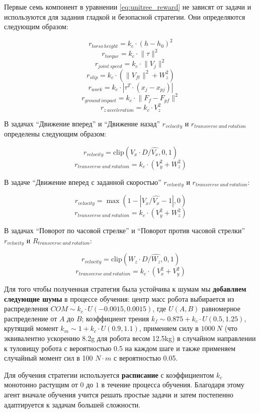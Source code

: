 Первые семь компонент в уравнении \ref{eq:unitree_reward} не зависят от задачи и используются для задания гладкой и безопасной стратегии. Они определяются следующим образом:

$$
r_{torso\ height}= k_c \cdot (h-h_0)^2
$$
$$
r_{torque} = k_c \cdot \lVert \tau \rVert ^2
$$
$$
r_{joint\ speed}= k_c \cdot \lVert V_j \rVert ^2
$$
$$
r_{slip} = k_c \cdot(\lVert V_{ft} \rVert ^2+ W_z^2)
$$
$$
r_{work}= k_c \cdot |\tau^T \cdot (x_j-x_{pj})|
$$
$$
r_{ground\ impact} = k_c \cdot \lVert F_f-F_{pf} \rVert ^2
$$
$$
r_{z\ acceleration}= k_c \cdot V_z^2
$$

В задачах ``Движение вперед'' и ``Движение назад'' $r_{velocity}$ и $r_{transverse\ and\ rotation}$ определены следующим образом: 

$$
r_{velocity} = \mathrm{clip}(V_x \cdot D / \hat{V_x}, 0, 1)
$$
$$
r_{transverse\ and\ rotation}= k_c \cdot (V_y^2+W_z^2)
$$

В задаче ``Движение вперед с заданной скоростью'' $r_{velocity}$ и $r_{transverse\ and\ rotation}$: 

$$
r_{velocity} = \max(1 - |V_x / \hat{V_x} - 1|, 0)
$$
$$
r_{transverse\ and\ rotation}= k_c \cdot (V_y^2+W_z^2)
$$

В задачах ``Поворот по часовой стрелке'' и ``Поворот против часовой стрелки'' $r_{velocity}$ и $R_{transverse\ and\ rotation}$: 

$$
r_{velocity} = \mathrm{clip}(W_z \cdot D / \hat{W_z}, 0, 1)
$$
$$
r_{transverse\ and\ rotation}= k_c \cdot (V_x^2+V_y^2)
$$

Для того чтобы полученная стратегия была устойчива к шумам мы \textbf{добавляем следующие шумы} в процессе обучения: центр масс робота выбирается из распределения $COM \sim k_c \cdot U(-0.0015, 0.0015)$, где $U(A,B)$ равномерное распределение от $A$ до $B$; коэффициент трения $k_f \sim 0.875 + k_c \cdot U(0.5, 1.25)$, крутящий момент $k_m \sim 1 + k_c \cdot U(0.9, 1.1)$, применяем силу в $1000\ N$ (что эквивалентно  ускорению 8.2g для робота весом 12.5kg) в случайном направлении к туловищу робота с вероятностью 0.5 на каждом шаге и также применяем случайный момент сил  в 100 $N \cdot m$ с вероятностью 0.05. 

Для обучения стратегии используется \textbf{расписание} с коэффициентом  $k_c$ монотонно растущим от $0$ до $1$ в течение процесса обучения. Благодаря этому агент вначале обучения учится решать простые задачи и затем постепенно адаптируется к задачам большей сложности.

